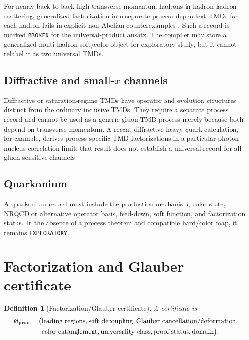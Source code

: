 \documentclass[11pt]{article}
\newtheorem{definition}{Definition}[section]
\begin{document}
For nearly back-to-back high-transverse-momentum hadrons in hadron-hadron scattering, generalized factorization into separate process-dependent TMDs for each hadron fails in explicit non-Abelian counterexamples \cite{RogersMulders2010}.  Such a record is marked \texttt{BROKEN} for the universal-product ansatz.  The compiler may store a generalized multi-hadron soft/color object for exploratory study, but it cannot relabel it as two universal TMDs.

\subsection{Diffractive and small-\texorpdfstring{\(x\)}{x} channels}

Diffractive or saturation-regime TMDs have operator and evolution structures distinct from the ordinary inclusive TMDs.  They require a separate process record and cannot be used as a generic gluon-TMD process merely because both depend on transverse momentum.  A recent diffractive heavy-quark calculation, for example, derives process-specific TMD factorizations in a particular photon-nucleus correlation limit; that result does not establish a universal record for all gluon-sensitive channels \cite{CaucalEtAl2026}.

\subsection{Quarkonium}

A quarkonium record must include the production mechanism, color state, NRQCD or alternative operator basis, feed-down, soft function, and factorization status.  In the absence of a process theorem and compatible hard/color map, it remains \texttt{EXPLORATORY}.

\section{Factorization and Glauber certificate}
\label{sec:glauber}

\begin{definition}[Factorization/Glauber certificate]
A certificate is
\begin{equation}
\begin{aligned}
 \mathfrak G_{\rm proc}=\bigl(&
 \text{leading regions},
 \text{soft decoupling},
 \text{Glauber cancellation/deformation},\\
 &\text{color entanglement},
 \text{universality class},
 \text{proof status},
 \text{domain}
 \bigr).
\end{aligned}
 \label{eq:glauber-certificate}
\end{equation}
\end{definition}
\end{document}
